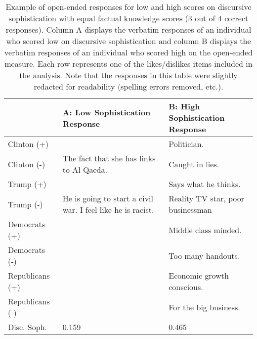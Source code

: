 \begin{table}[ht]\footnotesize\centering
\begin{tabular}{l|p{6.3cm}|p{6.3cm}}
\toprule
	& A: Low Sophistication Response & B: High Sophistication Response \\ \midrule
Clinton (+)		& 																& Politician. \\\hdashline
Clinton (-)		& The fact that she has links to Al-Qaeda. 						& Caught in lies. \\\hdashline
Trump (+)		& 																& Says what he thinks. \\\hdashline
Trump (-)		& He is going to start a civil war. I feel like he is racist. 	& Reality TV star, poor businessman \\\hdashline
Democrats (+)	& 																& Middle class minded. \\\hdashline
Democrats (-)	& 																& Too many handouts. \\\hdashline
Republicans (+)	& 																& Economic growth conscious. \\\hdashline
Republicans (-)	& 																& For the big business. \\\midrule
Disc. Soph. 	& 0.159 														& 0.465 \\\bottomrule

 \end{tabular}
\caption{Example of open-ended responses for low and high scores on discursive sophistication with equal factual knowledge scores (3 out of 4 correct responses). Column A displays the verbatim responses of an individual who scored low on discursive sophistication and column B displays the verbatim responses of an individual who scored high on the open-ended measure. Each row represents one of the likes/dislikes items included in the analysis. Note that the responses in this table were slightly redacted for readability (spelling errors removed, etc.).}\label{tab:ex1}
\end{table}

